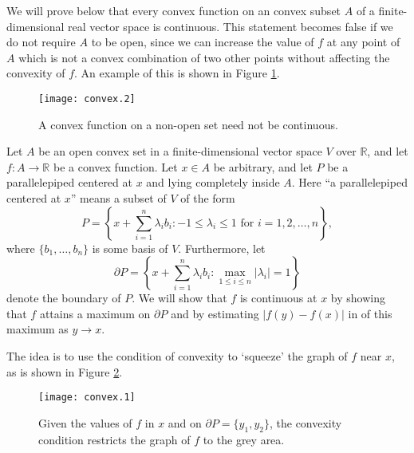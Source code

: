 \documentclass[12pt]{article}
\begin{document}
We will prove below that every convex function on an
 convex subset $A$ of a finite-dimensional
real vector space is continuous.  This statement becomes false if we
do not require $A$ to be open,
since we can increase the value of $f$ at any point of $A$ which is
not a convex combination of two other points without affecting the
convexity of $f$.  An example of this is shown in Figure \ref{fig2}.
\begin{figure}
\begin{center}
\texttt{[image: convex.2]}
\end{center}
\caption{A convex function on a non-open set need not be continuous.}
\label{fig2}
\end{figure}

Let $A$ be an open convex set in a finite-dimensional vector space $V$
over $\mathbb{R}$, and let $f\colon A\to\mathbb{R}$ be a convex
function.  Let $x\in A$ be arbitrary, and let $P$ be a parallelepiped
centered at $x$ and lying completely inside $A$.  Here ``a
parallelepiped centered at $x$'' means a subset of $V$ of the form
$$
P=\left\{x+\sum_{i=1}^n \lambda_ib_i\colon -1\le\lambda_i\le 1
\text{ for }i=1,2,\ldots,n\right\},
$$
where $\{b_1,\ldots,b_n\}$ is some basis of $V$.  Furthermore, let
$$
\partial P=\left\{x+\sum_{i=1}^n \lambda_ib_i\colon\max_{1\le i\le n}
\vert\lambda_i\vert=1\right\}
$$
denote the boundary of $P$.  We will show that $f$ is continuous at
$x$ by showing that $f$ attains a maximum on $\partial P$ and by
estimating $\vert f(y)-f(x)\vert$ in 
of this maximum as $y\to x$.

The idea is to use the condition of convexity to `squeeze' the graph
of $f$ near $x$, as is shown in Figure \ref{fig1}.
\begin{figure}
\begin{center}
\texttt{[image: convex.1]}
\end{center}
\caption{Given the values of $f$ in $x$ and on
  $\partial P=\{y_1,y_2\}$, the convexity condition restricts the
  graph of $f$ to the grey area.}
\label{fig1}
\end{figure}
\end{document}
